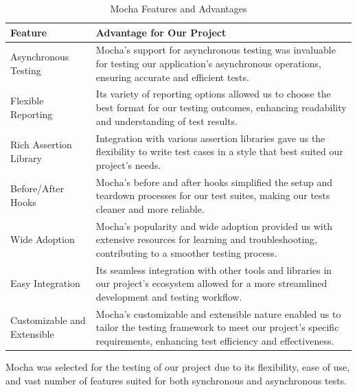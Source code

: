 \begin{table}[H]
    \centering
    \begin{tabularx}{\textwidth}{|l|X|}
        \hline
        \textbf{Feature}     & \textbf{Advantage for Our Project}                                                                                                                                  \\
        \hline
        Asynchronous Testing & Mocha's support for asynchronous testing was invaluable for testing our application's asynchronous operations, ensuring accurate and efficient tests.                   \\
        \hline
        Flexible Reporting   & Its variety of reporting options allowed us to choose the best format for our testing outcomes, enhancing readability and understanding of test results.               \\
        \hline
        Rich Assertion Library & Integration with various assertion libraries gave us the flexibility to write test cases in a style that best suited our project's needs.                          \\
        \hline
        Before/After Hooks  & Mocha's before and after hooks simplified the setup and teardown processes for our test suites, making our tests cleaner and more reliable.                           \\
        \hline
        Wide Adoption       & Mocha's popularity and wide adoption provided us with extensive resources for learning and troubleshooting, contributing to a smoother testing process.                 \\
        \hline
        Easy Integration    & Its seamless integration with other tools and libraries in our project's ecosystem allowed for a more streamlined development and testing workflow.                    \\
        \hline
        Customizable and Extensible & Mocha's customizable and extensible nature enabled us to tailor the testing framework to meet our project's specific requirements, enhancing test efficiency and effectiveness. \\
        \hline
    \end{tabularx}
    \label{tab:mochaTesting}
    \caption{Mocha Features and Advantages}
\end{table}

Mocha was selected for the testing of our project due to its flexibility, ease of use, and vast number of features suited for both synchronous and asynchronous tests. 

